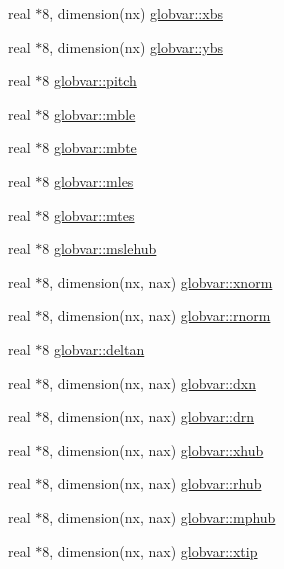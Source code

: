 \begin{DoxyCompactItemize}
\item 
real $\ast$8, dimension(nx) \hyperlink{namespaceglobvar_a9ae5763e77ebfcbe371431bd4f1eeb7e}{globvar\+::xbs}
\item 
real $\ast$8, dimension(nx) \hyperlink{namespaceglobvar_aabf35f2f56582d00668fde51696a4701}{globvar\+::ybs}
\item 
real $\ast$8 \hyperlink{namespaceglobvar_ae18c6278744d9db850158672b4cbd5ea}{globvar\+::pitch}
\item 
real $\ast$8 \hyperlink{namespaceglobvar_a60e1f3c0590fe494deaaa98bde27c96f}{globvar\+::mble}
\item 
real $\ast$8 \hyperlink{namespaceglobvar_a9f55e62c22dc5aef4a6167ef140b95d4}{globvar\+::mbte}
\item 
real $\ast$8 \hyperlink{namespaceglobvar_aadf047ab1c784bfc190712db2f3d8500}{globvar\+::mles}
\item 
real $\ast$8 \hyperlink{namespaceglobvar_abca0ebe31fa026de505bf14e3b3555ec}{globvar\+::mtes}
\item 
real $\ast$8 \hyperlink{namespaceglobvar_a077a5c5d840711646184a5e2f499a2d3}{globvar\+::mslehub}
\item 
real $\ast$8, dimension(nx, nax) \hyperlink{namespaceglobvar_ab440a94bbb0e22d41835056ae7c0ec08}{globvar\+::xnorm}
\item 
real $\ast$8, dimension(nx, nax) \hyperlink{namespaceglobvar_a1c81ec5abec812f5f2b8f01ca55a6b50}{globvar\+::rnorm}
\item 
real $\ast$8 \hyperlink{namespaceglobvar_a1f0ea87252716c9166c350308acd4289}{globvar\+::deltan}
\item 
real $\ast$8, dimension(nx, nax) \hyperlink{namespaceglobvar_a35cf297d0ef47b9b767c8840cd2e943c}{globvar\+::dxn}
\item 
real $\ast$8, dimension(nx, nax) \hyperlink{namespaceglobvar_a0544b64f4820db57c4ed8336dd2f6614}{globvar\+::drn}
\item 
real $\ast$8, dimension(nx, nax) \hyperlink{namespaceglobvar_a775a153351e6ee6aa485883756a69374}{globvar\+::xhub}
\item 
real $\ast$8, dimension(nx, nax) \hyperlink{namespaceglobvar_a0b0a00223529e708d5a7f66cc140e50d}{globvar\+::rhub}
\item 
real $\ast$8, dimension(nx, nax) \hyperlink{namespaceglobvar_a7278f73f6facd43ef016ecdef108b3b8}{globvar\+::mphub}
\item 
real $\ast$8, dimension(nx, nax) \hyperlink{namespaceglobvar_adeaf213bc236c950b34c4e2fb10cf12d}{globvar\+::xtip}
\item 

\end{DoxyCompactItemize}
